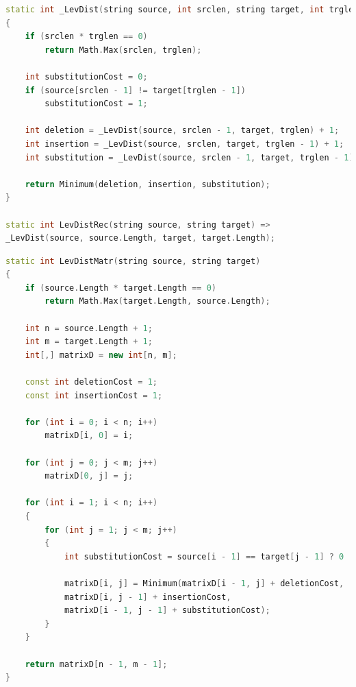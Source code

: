 \documentclass{report}
\begin{document}
\begin{lstlisting}[label=code1,caption=Функция для рекурсивного нахождения расстояния Левенштейна, language=C++]
static int _LevDist(string source, int srclen, string target, int trglen)
{
	if (srclen * trglen == 0)
		return Math.Max(srclen, trglen);
	
	int substitutionCost = 0;
	if (source[srclen - 1] != target[trglen - 1])
		substitutionCost = 1;
	
	int deletion = _LevDist(source, srclen - 1, target, trglen) + 1;
	int insertion = _LevDist(source, srclen, target, trglen - 1) + 1;
	int substitution = _LevDist(source, srclen - 1, target, trglen - 1) + substitutionCost;
	
	return Minimum(deletion, insertion, substitution);
}

static int LevDistRec(string source, string target) =>
_LevDist(source, source.Length, target, target.Length);
\end{lstlisting}
\newpage
\begin{lstlisting}[label=code2,caption=Функция для нерекурсивного нахождения расстояния Левенштейна с кэшем в виде матрицы,language=C++]
static int LevDistMatr(string source, string target)
{
	if (source.Length * target.Length == 0)
		return Math.Max(target.Length, source.Length);
	
	int n = source.Length + 1;
	int m = target.Length + 1;
	int[,] matrixD = new int[n, m];
	
	const int deletionCost = 1;
	const int insertionCost = 1;
	
	for (int i = 0; i < n; i++)
		matrixD[i, 0] = i;
	
	for (int j = 0; j < m; j++)
		matrixD[0, j] = j;
	
	for (int i = 1; i < n; i++)
	{
		for (int j = 1; j < m; j++)
		{
			int substitutionCost = source[i - 1] == target[j - 1] ? 0 : 1;
			
			matrixD[i, j] = Minimum(matrixD[i - 1, j] + deletionCost,          
			matrixD[i, j - 1] + insertionCost,         
			matrixD[i - 1, j - 1] + substitutionCost); 
		}
	}
	
	return matrixD[n - 1, m - 1];
}
\end{lstlisting}
\end{document}
